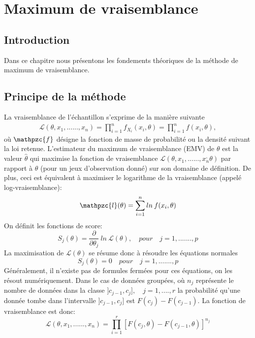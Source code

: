 \documentclass[french]{report}
\begin{document}
\chapter{Maximum de vraisemblance}
\section{Introduction}
Dans ce chapitre nous présentons les fondements théoriques de la méthode de maximum de vraisemblance.
\section{Principe de la méthode}
La vraisemblance de l'échantillon s'exprime de la manière suivante\cite{Max de vraisemblance1}
\begin{align*}
    \mathcal{L}(\theta,x_1,......,x_n) = \prod_{i=1}^{n} f_{X_i}(x_i,\theta) = \prod_{i=1}^{n} f(x_i,\theta),
\end{align*}
où $\mathpzc{f}$ désigne la fonction de masse de probabilité ou la densité suivant la loi retenue. L'estimateur du maximum de vraisemblance (EMV) de $\theta$ est la valeur $\hat{\theta}$ qui maximise la fonction de vraisemblance $\mathcal{L}(\theta,x_1,......,x_n^,\theta)$ par rapport à $\theta$ (pour un jeux d'observation donné) sur son domaine de définition. De plus, ceci est équivalent à maximiser le logarithme de la vraisemblance (appelé log-vraisemblance):
\begin{equation*}
    \mathpzc{l}(\theta) = \sum_{i=1}^{n} ln \: f(x_i,\theta)
\end{equation*}
On définit les fonctions de score:
\begin{equation*}
    S_j(\theta) = \frac{\partial}{\partial \theta_j} \: ln \: \mathcal{L}(\theta), \quad pour \quad j=1,.......,p
\end{equation*}
La maximisation de $\mathcal{L}(\theta)$ se résume donc à résoudre les équations normales\\
\begin{equation*}
    S_j(\theta) = 0 \quad pour \quad j=1,.......,p
\end{equation*}
Généralement, il n'existe pas de formules fermées pour ces équations, on les résout numériquement.
\vskip 0.1in
Dans le cas de données groupées, où $n_j$ représente le nombre de données dans la classe $]c_{j−1}, c_j ], \quad j = 1,....,r$ la probabilité qu'une donnée tombe dans l'intervalle $]c_{j−1}, c_j ]$ est $F(c_j) -
F(c_{j−1})$. La fonction de vraisemblance est donc:
\begin{equation*}
    \mathcal{L}(\theta,x_1,......,x_n) = \prod_{i=1}^{r} [F(c_j,\theta) - F(c_{j-1},\theta)]^{n_j}
\end{equation*}
\end{document}
